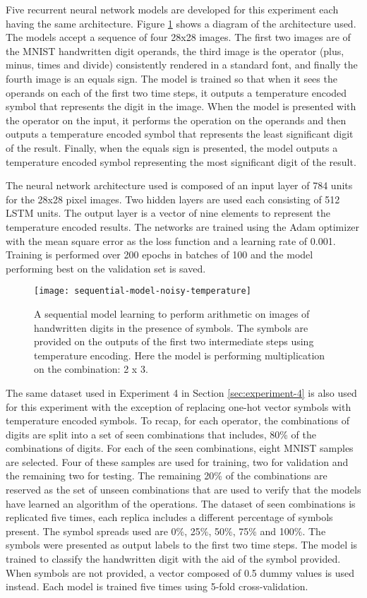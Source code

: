 Five recurrent neural network models are developed for this experiment each having the same architecture. Figure \ref{fig:sequential-model-noisy-temperature} shows a diagram of the architecture used. The models accept a sequence of four 28x28 images. The first two images are of the MNIST handwritten digit operands, the third image is the operator (plus, minus, times and divide) consistently rendered in a standard font, and finally the fourth image is an equals sign. The model is trained so that when it sees the operands on each of the first two time steps, it outputs a temperature encoded symbol that represents the digit in the image. When the model is presented with the operator on the input, it performs the operation on the operands and then outputs a temperature encoded symbol that represents the least significant digit of the result. Finally, when the equals sign is presented, the model outputs a temperature encoded symbol representing the most significant digit of the result.

The neural network architecture used is composed of an input layer of 784 units for the 28x28 pixel images. Two hidden layers are used each consisting of 512 LSTM units. The output layer is a vector of nine elements to represent the temperature encoded results. The networks are trained using the Adam optimizer with the mean square error as the loss function and a learning rate of 0.001. Training is performed over 200 epochs in batches of 100 and the model performing best on the validation set is saved.

\begin{figure}
	\centering
	\texttt{[image: sequential-model-noisy-temperature]}
	\caption{A sequential model learning to perform arithmetic on images of handwritten digits in the presence of symbols. The symbols are provided on the outputs of the first two intermediate steps using temperature encoding. Here the model is performing multiplication on the combination: 2 x 3.}
	\label{fig:sequential-model-noisy-temperature}
\end{figure}

The same dataset used in Experiment 4 in Section \ref{sec:experiment-4} is also used for this experiment with the exception of replacing one-hot vector symbols with temperature encoded symbols. To recap, for each operator, the combinations of digits are split into a set of seen combinations that includes, 80\% of the combinations of digits. For each of the seen combinations, eight MNIST samples are selected. Four of these samples are used for training, two for validation and the remaining two for testing. The remaining 20\% of the combinations are reserved as the set of unseen combinations that are used to verify that the models have learned an algorithm of the operations. The dataset of seen combinations is replicated five times, each replica includes a different percentage of symbols present. The symbol spreads used are 0\%, 25\%, 50\%, 75\% and 100\%. The symbols were presented as output labels to the first two time steps. The model is trained to classify the handwritten digit with the aid of the symbol provided. When symbols are not provided, a vector composed of 0.5 dummy values is used instead. Each model is trained five times using 5-fold cross-validation.

